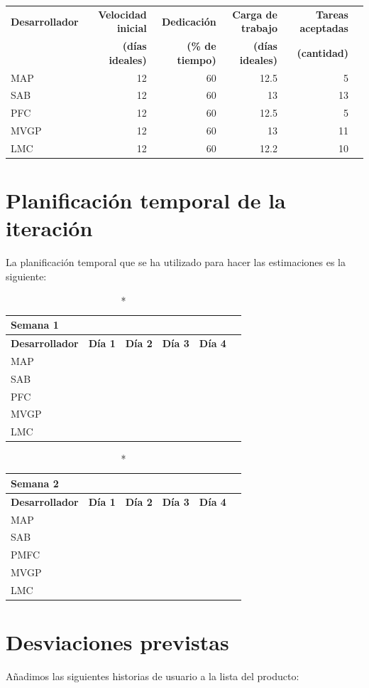 \documentclass[11pt]{article}
\begin{document}
\begin{table}[H]
  \centering

  \begin{adjustbox}{width=\textwidth}
\begin{tabular}{lrrrrr}
  \toprule
  \textbf{Desarrollador} & \textbf{Velocidad inicial} & \textbf{Dedicación} & \textbf{Carga de trabajo} & \textbf{Tareas aceptadas} \\
  & \textbf{(días ideales)} & \textbf{(\% de tiempo)} & \textbf{(días ideales)} & \textbf{ (cantidad)}\\
  \midrule
  MAP & 12 & 60 & 12.5 & 5\\
  SAB & 12 & 60 & 13 & 13\\
  PFC & 12 & 60 & 12.5 & 5\\
  MVGP & 12 & 60 & 13 & 11\\
  LMC & 12 & 60 & 12.2 & 10\\
  \bottomrule
\end{tabular}
\end{adjustbox}
\end{table}

\section{Planificación temporal de la iteración}
La planificación temporal que se ha utilizado para hacer las estimaciones es la siguiente:


\begin{longtable}{lrrrrr}
  \caption*{Semana 1}\\
  \toprule
  \textbf{Desarrollador} & \textbf{Día 1} & \textbf{Día 2} & \textbf{Día 3} & \textbf{Día 4} \\
  \midrule
  MAP &  &  &  &  \\
  SAB &  &  &  & \\
  PFC \\
  MVGP & & \\
  LMC \\
  \bottomrule
\end{longtable}

\begin{longtable}{lrrrrr}
  \caption*{Semana 2}\\
  \toprule
  \textbf{Desarrollador} & \textbf{Día 1} & \textbf{Día 2} & \textbf{Día 3} & \textbf{Día 4} \\
  \midrule
  MAP &  & \\
  SAB &  & \\
  PMFC \\
  MVGP & & \\
  LMC \\
  \bottomrule
\end{longtable}

\section{Desviaciones previstas}

Añadimos las siguientes historias de usuario a la lista del producto:
\end{document}
